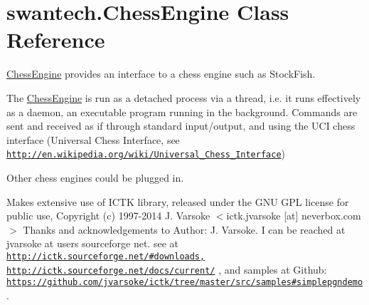 \hypertarget{classswantech_1_1_chess_engine}{}\section{swantech.\+Chess\+Engine Class Reference}
\label{classswantech_1_1_chess_engine}


\hyperlink{classswantech_1_1_chess_engine}{Chess\+Engine} provides an interface to a chess engine such as Stock\+Fish. 

The \hyperlink{classswantech_1_1_chess_engine}{Chess\+Engine} is run as a detached process via a thread, i.\+e. it runs effectively as a daemon, an executable program running in the background. Commands are sent and received as if through standard input/output, and using the U\+C\+I chess interface (Universal Chess Interface, see \href{http://en.wikipedia.org/wiki/Universal_Chess_Interface}{\tt http\+://en.\+wikipedia.\+org/wiki/\+Universal\+\_\+\+Chess\+\_\+\+Interface}) 

Other chess engines could be plugged in. 

Makes extensive use of I\+C\+T\+K library, released under the G\+N\+U G\+P\+L license for public use, Copyright (c) 1997-\/2014 J. Varsoke $<$ictk.\+jvarsoke \mbox{[}at\mbox{]} neverbox.\+com$>$ Thanks and acknowledgements to Author\+: J. Varsoke. I can be reached at jvarsoke at users sourceforge net. see at \href{http://ictk.sourceforge.net/#downloads,}{\tt http\+://ictk.\+sourceforge.\+net/\#downloads,} \href{http://ictk.sourceforge.net/docs/current/}{\tt http\+://ictk.\+sourceforge.\+net/docs/current/} , and samples at Github\+: \href{https://github.com/jvarsoke/ictk/tree/master/src/samples#simplepgndemo}{\tt https\+://github.\+com/jvarsoke/ictk/tree/master/src/samples\#simplepgndemo}.  


